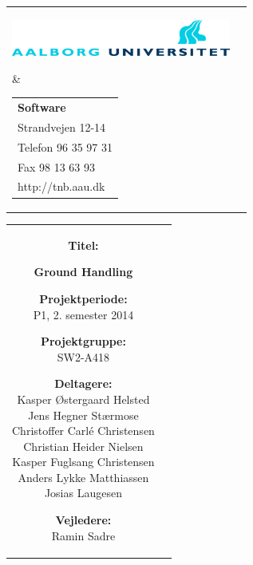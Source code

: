 \thispagestyle{empty}
\begin{titlepage}
	\setlength{\textwidth}{15cm}
	\noindent
	\begin{nopagebreak}
		{\samepage 
			\begin{tabular}{lr}
				\parbox{0.5\textwidth}{\raisebox{11mm}
					{\includegraphics[height=1.2cm]{Grafik/aauLogoDa}}
				} &
				\parbox{0.5\textwidth}{
					\small
					\begin{tabular}{l}
						{\sf\small \textbf{Software}}\\
						{\sf\small Strandvejen 12-14} \\
						{\sf\small Telefon 96 35 97 31} \\
						{\sf\small Fax 98 13 63 93} \\
						{\sf\small http://tnb.aau.dk}
					\end{tabular}
				}
			\end{tabular}
			
			\noindent
			\begin{tabular}{cc}
				\parbox{7cm}{
					\begin{description}
			
						\item {\bf Titel:} 
			
							\textbf{Ground Handling}\\
						\item {\bf Projektperiode:}\\
			  				P1, 2. semester 2014
			 				\hspace{4cm}
						\item {\bf Projektgruppe:}\\
							SW2-A418
			  				\hspace{4cm}
						\item {\bf Deltagere:}\\
							Kasper Østergaard Helsted\\
                            Jens Hegner Stærmose\\
                            Christoffer Carlé Christensen\\
                            Christian Heider Nielsen\\
                            Kasper Fuglsang Christensen\\
                            Anders Lykke Matthiassen\\
                            Josias Laugesen\\
							\hspace{2cm}
						\item {\bf Vejledere:}\\
							Ramin Sadre\\


\end{description}}
\end{tabular}}
\end{nopagebreak}
\end{titlepage}
